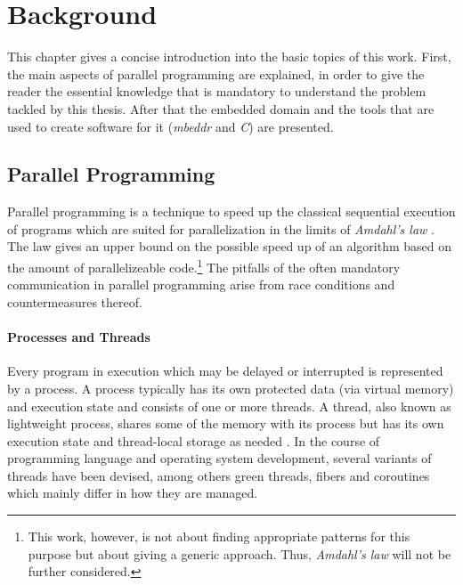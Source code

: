 \chapter{Background}
\label{background}
This chapter gives a concise introduction into the basic topics of this work. First, the main aspects of parallel programming are explained, in order to give the reader the essential knowledge that is mandatory to understand the problem tackled by this thesis. After that the embedded domain and the tools that are used to create software for it (\textit{mbeddr} and \textit{C}) are presented.

\section{Parallel Programming}
Parallel programming is a technique to speed up the classical sequential execution of programs which are suited for parallelization in the limits of \textit{Amdahl's law} \cite{Amdahl}\cite{MathematicalLimits}. The law gives an upper bound on the possible speed up of an algorithm based on the amount of parallelizeable code.\footnote{This work, however, is not about finding appropriate patterns for this purpose but about giving a generic approach. Thus, \textit{Amdahl's law} will not be further considered.} The pitfalls of the often mandatory communication in parallel programming arise from race conditions and countermeasures thereof.

\subsubsection{Processes and Threads}
Every program in execution which may be delayed or interrupted is represented by a process. A process typically has its own protected data (via virtual memory) and execution state and consists of one or more threads. A thread, also known as lightweight process, shares some of the memory with its process but has its own execution state and thread-local storage as needed \cite[p.~20]{PrinciplesOfModernOSs}. In the course of programming language and operating system development, several variants of threads have been devised, among others green threads, fibers and coroutines which mainly differ in how they are managed.

